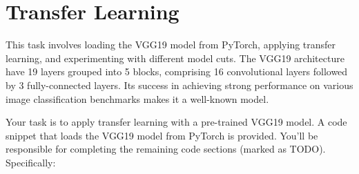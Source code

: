 \documentclass[11pt]{scrartcl}
\begin{document}
\section{Transfer Learning}

This task involves loading the VGG19 model from PyTorch, 
applying transfer learning, and experimenting with different model cuts. 
The VGG19 architecture have 19 layers grouped into 5 blocks, 
comprising 16 convolutional layers followed by 3 fully-connected layers. 
Its success in achieving strong performance on various image classification benchmarks 
makes it a well-known model.

Your task is to apply transfer learning with a pre-trained VGG19 model. 
A code snippet that loads the VGG19 model from PyTorch is provided. 
You'll be responsible for completing the remaining code sections (marked as TODO). 
Specifically:
\end{document}
